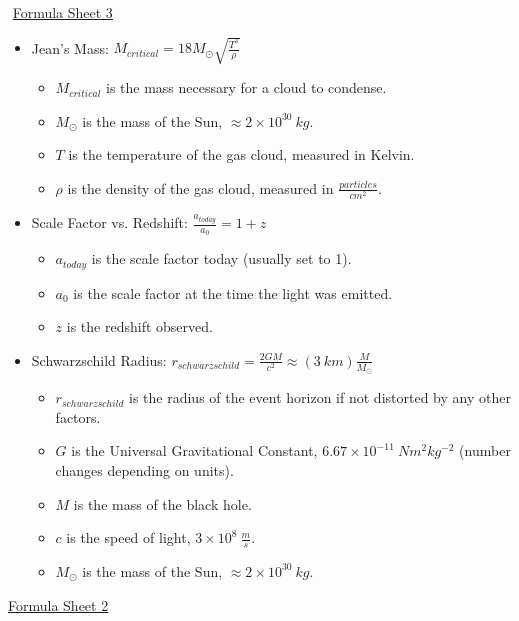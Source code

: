 \documentclass[letterpaper,14pt]{extarticle}
\begin{document}
\edef\tmp{\the\baselineskip}
\setstackgap{L}{\tmp}
$   $\newline
\underline{Formula Sheet 3}
\begin{itemize}
    \item Jean's Mass: $M_{critical} = 18M_\odot \sqrt{\frac{T^3}{\rho}}$
    \begin{itemize}
        \item $M_{critical}$ is the mass necessary for a cloud to condense.
        \item $M_\odot$ is the mass of the Sun, $\approx 2 \times 10^{30}\ kg$.
        \item $T$ is the temperature of the gas cloud, measured in Kelvin.
        \item $\rho$ is the density of the gas cloud, measured in $\frac{particles}{cm^2}$.
    \end{itemize}
    \item Scale Factor vs. Redshift: $\frac{a_{today}}{a_0} = 1 + z$
    \begin{itemize}
        \item $a_{today}$ is the scale factor today (usually set to 1).
        \item $a_0$ is the scale factor at the time the light was emitted.
        \item $z$ is the redshift observed.
    \end{itemize}
    \item Schwarzschild Radius: $r_{schwarzschild} = \frac{2GM}{c^2} \approx (3\ km) \frac{M}{M_\odot}$
    \begin{itemize}
        \item $r_{schwarzschild}$ is the radius of the event horizon if not distorted by any other factors.
        \item $G$ is the Universal Gravitational Constant, $6.67 \times 10^{-11}\ Nm^2kg^{-2}$ (number changes depending on units).
        \item $M$ is the mass of the black hole.
        \item $c$ is the speed of light, $3 \times 10^8\ \frac{m}{s}$. 
        \item $M_\odot$ is the mass of the Sun, $\approx 2 \times 10^{30}\ kg$.
    \end{itemize}
\end{itemize}
\pagebreak
\underline{Formula Sheet 2}
\end{document}
